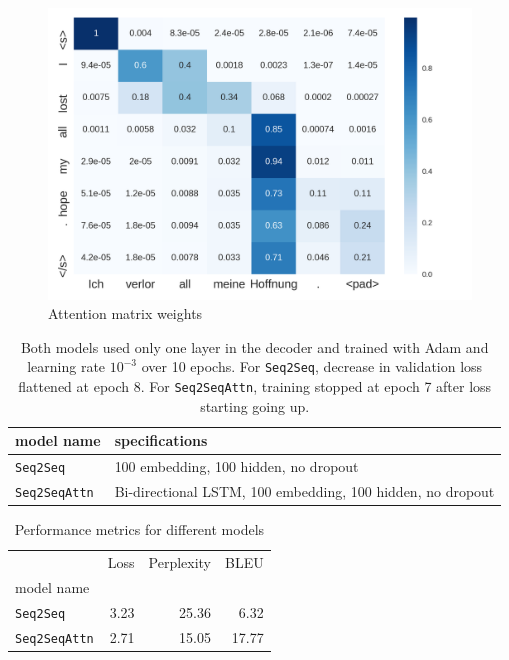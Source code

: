 \documentclass[12pt]{article}
\begin{document}
\begin{figure}
	\centering
	\includegraphics[width=.8\linewidth]{figs/attn_mat.png}
	\caption{Attention matrix weights}
	\label{fig:mat_weights}
\end{figure}

\begin{landscape}
\begin{table}[tb]
    
    \centering
\begin{tabular}{ll}
\toprule
model name                   &specifications\\
\midrule
\texttt{Seq2Seq} & 100 embedding, 100 hidden, no dropout\\
\texttt{Seq2SeqAttn} & Bi-directional LSTM, 100 embedding, 100 hidden, no dropout\\
\bottomrule
\end{tabular}
    \caption{Both models used only one layer in the decoder and trained with Adam and learning rate $10^{-3}$ over 10 epochs. For \texttt{Seq2Seq}, decrease in validation loss flattened at epoch 8. For \texttt{Seq2SeqAttn}, training stopped at epoch 7 after loss starting going up.}
    \label{tab:spec}
\end{table}
\begin{table}[h]
\centering
\begin{tabular}{lrrr}
\toprule
{}                                     & Loss  & Perplexity & BLEU \\
model name                             &       &        & \\
\midrule
\texttt{Seq2Seq}                      & 3.23 & 25.36  & 6.32 \\
\texttt{Seq2SeqAttn}                      & 2.71 & 15.05  & 17.77 \\
\bottomrule
\end{tabular}
\caption{Performance metrics for different models}
\label{table:performance}
\end{table}
\end{landscape}
\end{document}
